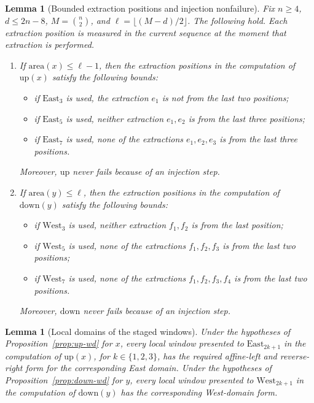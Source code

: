\documentclass[11pt]{article}
\theoremstyle{plain}
\newtheorem{lemma}[theorem]{Lemma}
\theoremstyle{definition}
\theoremstyle{remark}
\newcommand{\area}{\mathrm{area}}
\begin{document}
\begin{lemma}[Bounded extraction positions and injection nonfailure]
\label{lem:positions-wd}
Fix \(n\ge4\), \(d\le2n-8\), \(M=\binom n2\), and
\(\ell=\lfloor(M-d)/2\rfloor\).  The following hold.  Each extraction
position is measured in the current sequence at the moment that extraction is
performed.
\begin{enumerate}[label=\textup{(\roman*)}]
  \item If \(\area(x)\le \ell-1\), then the extraction positions in the
  computation of \(\mathrm{up}(x)\) satisfy the following bounds:
  \begin{itemize}
    \item if \(\mathrm{East}_3\) is used, the extraction \(e_1\) is not from
    the last two positions;
    \item if \(\mathrm{East}_5\) is used, neither extraction \(e_1,e_2\) is
    from the last three positions;
    \item if \(\mathrm{East}_7\) is used, none of the extractions
    \(e_1,e_2,e_3\) is from the last three positions.
  \end{itemize}
  Moreover, \(\mathrm{up}\) never fails because of an injection step.

  \item If \(\area(y)\le \ell\), then the extraction positions in the
  computation of \(\mathrm{down}(y)\) satisfy the following bounds:
  \begin{itemize}
    \item if \(\mathrm{West}_3\) is used, neither extraction \(f_1,f_2\) is
    from the last position;
    \item if \(\mathrm{West}_5\) is used, none of the extractions
    \(f_1,f_2,f_3\) is from the last two positions;
    \item if \(\mathrm{West}_7\) is used, none of the extractions
    \(f_1,f_2,f_3,f_4\) is from the last two positions.
  \end{itemize}
  Moreover, \(\mathrm{down}\) never fails because of an injection step.
\end{enumerate}
\end{lemma}

\begin{lemma}[Local domains of the staged windows]
\label{lem:staged-window-domains}
Under the hypotheses of Proposition~\ref{prop:up-wd} for \(x\), every local
window presented to \(\mathrm{East}_{2k+1}\) in the computation of
\(\mathrm{up}(x)\), for \(k\in\{1,2,3\}\), has the required affine-left and
reverse-right form for the corresponding East domain.  Under the hypotheses of
Proposition~\ref{prop:down-wd} for \(y\), every local window presented to
\(\mathrm{West}_{2k+1}\) in the computation of \(\mathrm{down}(y)\) has the
corresponding West-domain form.
\end{lemma}
\end{document}
